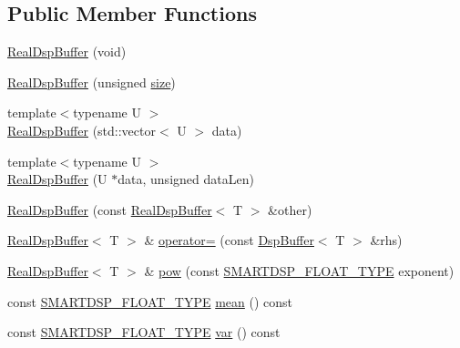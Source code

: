 \subsection*{Public Member Functions}
\begin{DoxyCompactItemize}
\item 
\hyperlink{class_smart_dsp_1_1_real_dsp_buffer_ae5bd9282a607c876c85dfcf3d4c096c2}{Real\+Dsp\+Buffer} (void)
\item 
\hyperlink{class_smart_dsp_1_1_real_dsp_buffer_a0e3133404be83c2fb4272d89e719bfe6}{Real\+Dsp\+Buffer} (unsigned \hyperlink{class_smart_dsp_1_1_dsp_buffer_af931c57c26c1f459cae47ca4b249d402}{size})
\item 
{\footnotesize template$<$typename U $>$ }\\\hyperlink{class_smart_dsp_1_1_real_dsp_buffer_a49436d4de244c657abc1e85f7be3c9e0}{Real\+Dsp\+Buffer} (std\+::vector$<$ U $>$ data)
\item 
{\footnotesize template$<$typename U $>$ }\\\hyperlink{class_smart_dsp_1_1_real_dsp_buffer_a061791c79feca4c976512af36aa3e3b9}{Real\+Dsp\+Buffer} (U $\ast$data, unsigned data\+Len)
\item 
\hyperlink{class_smart_dsp_1_1_real_dsp_buffer_a8ee27b5155b47c1e0871c999d87f53be}{Real\+Dsp\+Buffer} (const \hyperlink{class_smart_dsp_1_1_real_dsp_buffer}{Real\+Dsp\+Buffer}$<$ T $>$ \&other)
\item 
\hyperlink{class_smart_dsp_1_1_real_dsp_buffer}{Real\+Dsp\+Buffer}$<$ T $>$ \& \hyperlink{class_smart_dsp_1_1_real_dsp_buffer_a59f770086f96d02c5ebbc2e8c2c32355}{operator=} (const \hyperlink{class_smart_dsp_1_1_dsp_buffer}{Dsp\+Buffer}$<$ T $>$ \&rhs)
\item 
\hyperlink{class_smart_dsp_1_1_real_dsp_buffer}{Real\+Dsp\+Buffer}$<$ T $>$ \& \hyperlink{class_smart_dsp_1_1_real_dsp_buffer_ab632957839103d9f2d86db3eaf1b8b5c}{pow} (const \hyperlink{_dsp_buffer_8h_a9ed4123d332590f7a6161bc2061eac49}{S\+M\+A\+R\+T\+D\+S\+P\+\_\+\+F\+L\+O\+A\+T\+\_\+\+T\+Y\+P\+E} exponent)
\item 
const \hyperlink{_dsp_buffer_8h_a9ed4123d332590f7a6161bc2061eac49}{S\+M\+A\+R\+T\+D\+S\+P\+\_\+\+F\+L\+O\+A\+T\+\_\+\+T\+Y\+P\+E} \hyperlink{class_smart_dsp_1_1_real_dsp_buffer_a731292861a4adf55385f14c3585274d6}{mean} () const 
\item 
const \hyperlink{_dsp_buffer_8h_a9ed4123d332590f7a6161bc2061eac49}{S\+M\+A\+R\+T\+D\+S\+P\+\_\+\+F\+L\+O\+A\+T\+\_\+\+T\+Y\+P\+E} \hyperlink{class_smart_dsp_1_1_real_dsp_buffer_a1d9b740ccc718fc524961091bd95367c}{var} () const 

\end{DoxyCompactItemize}
